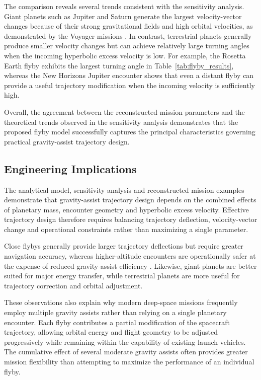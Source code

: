 \documentclass[11pt,a4paper]{article}
\begin{document}
The comparison reveals several trends consistent with the sensitivity analysis. Giant planets such as Jupiter and Saturn generate the largest velocity-vector changes because of their strong gravitational fields and high orbital velocities, as demonstrated by the Voyager missions \cite{voyager1}. In contrast, terrestrial planets generally produce smaller velocity changes but can achieve relatively large turning angles when the incoming hyperbolic excess velocity is low. For example, the Rosetta Earth flyby exhibits the largest turning angle in Table~\ref{tab:flyby_results}, whereas the New Horizons Jupiter encounter shows that even a distant flyby can provide a useful trajectory modification when the incoming velocity is sufficiently high.

Overall, the agreement between the reconstructed mission parameters and the theoretical trends observed in the sensitivity analysis demonstrates that the proposed flyby model successfully captures the principal characteristics governing practical gravity-assist trajectory design.

\subsection{Engineering Implications}

The analytical model, sensitivity analysis and reconstructed mission examples demonstrate that gravity-assist trajectory design depends on the combined effects of planetary mass, encounter geometry and hyperbolic excess velocity. Effective trajectory design therefore requires balancing trajectory deflection, velocity-vector change and operational constraints rather than maximizing a single parameter.

Close flybys generally provide larger trajectory deflections but require greater navigation accuracy, whereas higher-altitude encounters are operationally safer at the expense of reduced gravity-assist efficiency \cite{strange2002}. Likewise, giant planets are better suited for major energy transfer, while terrestrial planets are more useful for trajectory correction and orbital adjustment.

These observations also explain why modern deep-space missions frequently employ multiple gravity assists rather than relying on a single planetary encounter. Each flyby contributes a partial modification of the spacecraft trajectory, allowing orbital energy and flight geometry to be adjusted progressively while remaining within the capability of existing launch vehicles. The cumulative effect of several moderate gravity assists often provides greater mission flexibility than attempting to maximize the performance of an individual flyby.
\end{document}
